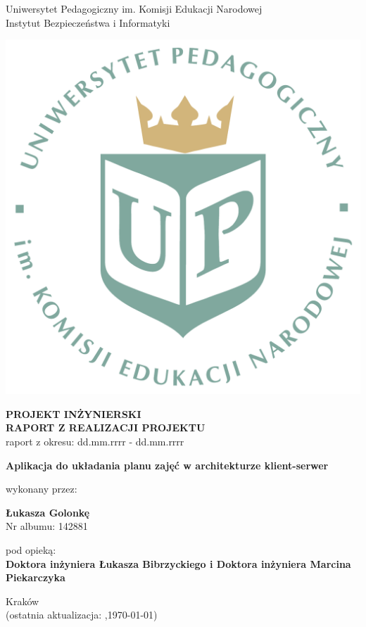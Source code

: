 \documentclass[12pt,a4paper,oneside]{article}
\theoremstyle{definition}
\numberwithin{equation}{section}
\begin{document}

\thispagestyle{empty}
\begin{titlepage}
\begin{center}\Large
Uniwersytet Pedagogiczny im. Komisji Edukacji Narodowej \\
\large
Instytut Bezpieczeństwa i Informatyki\\
\vskip 10pt
\end{center}
\begin{center}
\centering \includegraphics[width=0.4\columnwidth]{../resources/images/logoUP_pl.pdf}
\end{center}

\begin{center}
 {\bf \fontsize{14pt}{14pt}\selectfont PROJEKT INŻYNIERSKI \\ RAPORT Z REALIZACJI PROJEKTU\\
 }
 {\fontsize{12pt}{12pt} raport z okresu: dd.mm.rrrr - dd.mm.rrrr}
\end{center}
\vskip 5pt
\begin{center}
 {\bf \fontsize{22pt}{22pt}\selectfont Aplikacja do układania planu zajęć w architekturze klient-serwer}
\end{center}

\begin{center}
 {\fontsize{12pt}{12pt}\selectfont wykonany przez: }
\end{center}
\begin{center}
 {\bf\fontsize{16pt}{16pt}\selectfont Łukasza Golonkę}\\
 {\fontsize{12pt}{12pt}\selectfont Nr albumu: 142881 \\}
\end{center}
\begin{center}
 {\fontsize{12pt}{12pt}\selectfont pod opieką:}\\
 {\bf\fontsize{12pt}{12pt}\selectfont Doktora inżyniera Łukasza Bibrzyckiego i Doktora inżyniera Marcina Piekarczyka}
\end{center}

\vspace*{\fill}
\begin{center}
\large
Kraków \the\year\\
(ostatnia aktualizacja: \DTMcurrenttime,\;\today)
\end{center}
\end{titlepage}
\setcounter{page}{0} 
\newpage\null\thispagestyle{empty}
\end{document}

